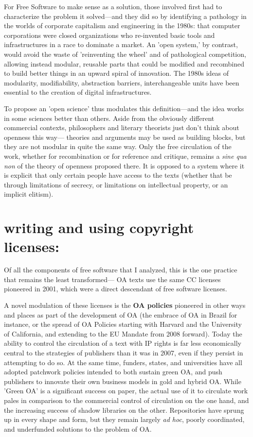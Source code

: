 \documentclass[11pt]{report}
\begin{document}
For Free Software to make sense as a solution, those involved first had to characterize the problem it solved---and they did so by identifying a pathology in the worlds of corporate capitalism and engineering in the 1980s: that computer corporations were closed organizations who re-invented basic tools and infrastructures in a race to dominate a market.    An 'open system,' by contrast, would avoid the waste of 'reinventing the wheel' and of pathological competition, allowing instead  modular, reusable parts that could be modified and recombined to build better things in an upward spiral of innovation.  The 1980s ideas of modularity, modifiability, abstraction barriers, interchangeable units have been essential to the creation of digital infrastructures. 

To propose an 'open science' thus modulates this definition---and the idea works in some sciences better than others.  Aside from the obviously different commercial contexts, philosophers and literary theorists just don't think about openness this way--- theories and arguments may be used as building blocks, but they are not modular in quite the same way.  Only the free circulation of the work, whether for recombination or for reference and critique, remains a \emph{sine qua non} of the theory of openness proposed there.   It is opposed to a system where it is explicit that only certain people have access to the texts (whether that be through limitations of secrecy, or limitations on intellectual property, or an implicit elitism). 

\section*{\textbf{writing and using copyright licenses}:}
\label{sec:org86fe590}

Of all the components of free software that I analyzed, this is the one practice that remains the least transformed--- OA texts use the same CC licenses pioneered in 2001, which were a direct descendant of free software licenses.

A novel modulation of these licenses is the \textbf{OA policies} pioneered in other ways and places as part of the development of OA (the embrace of OA in Brazil for instance, or the spread of OA Policies starting with Harvard and the University of California, and extending to the EU Mandate from 2008 forward).  Today the ability to control the circulation of a text with IP rights is far less economically central to the strategies of publishers than it was in 2007, even if they persist in attempting to do so.  At the same time, funders, states, and universities have all adopted patchwork policies intended to both sustain green OA, and push publishers to innovate their own business models in gold and hybrid OA.  While 'Green OA' is a significant success on paper, the actual use of it to circulate work pales in comparison to the commercial control of circulation on the one hand, and the increasing success of shadow libraries on the other. Repositories have sprung up in every shape and form, but they remain largely \emph{ad hoc}, poorly coordinated, and underfunded solutions to the problem of OA.
\end{document}
